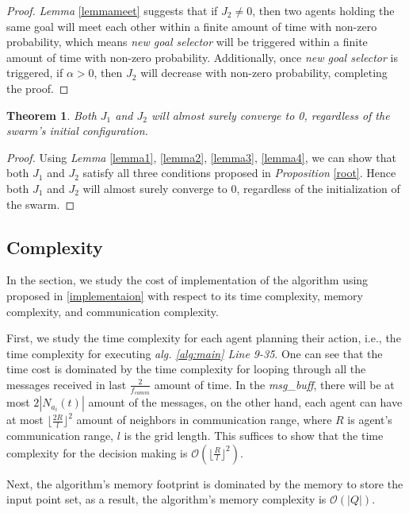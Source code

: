 \documentclass[journal]{IEEEtran}
\newtheorem{theorem}{Theorem}[subsection]
\begin{document}
\begin{proof}
\textit{Lemma} \ref{lemmameet} suggests that if $J_2\neq 0$, then two agents holding the same goal will meet each other within a finite amount of time with non-zero probability, which means \textit{new goal selector} will be triggered within a finite amount of time with non-zero probability. Additionally, once \textit{new goal selector} is triggered, if $\alpha > 0$, then $J_2$ will decrease with non-zero probability, completing the proof. 
\end{proof}


\begin{theorem} 
Both $J_1$ and $J_2$ will almost surely converge to 0, regardless of the swarm's initial configuration.
\end{theorem}

\begin{proof}
Using \textit{Lemma} \ref{lemma1}, \ref{lemma2}, \ref{lemma3}, \ref{lemma4}, we can show that both $J_1$ and $J_2$ satisfy all three conditions proposed in \textit{Proposition} \ref{root}. Hence both $J_1$ and $J_2$ will almost surely converge to 0, regardless of the initialization of the swarm.
\end{proof}

\subsection{Complexity}
In the section, we study the cost of implementation of the algorithm using proposed in \ref{implementaion} with respect to its time complexity, memory complexity, and communication complexity. 

First, we study the time complexity for each agent planning their action, i.e., the time complexity for executing \textit{alg. \ref{alg:main} \textit{Line 9-35}}. One can see that the time cost is dominated by the time complexity for looping through all the messages received in last $\frac{2}{f_{comm}}$ amount of time. In the \textit{msg\_buff}, there will be at most $2|N_{a_i}(t)|$ amount of the messages, on the other hand, each agent can have at most $\lfloor{\frac{2R}{l}}\rfloor^2$ amount of neighbors in communication range, where $R$ is agent's communication range, $l$ is the grid length. This suffices to show that the time complexity for the decision making is $\mathcal{O}(\lfloor{\frac{R}{l}}\rfloor^2)$. 

Next, the algorithm's memory footprint is dominated by the memory to store the input point set, as a result, the algorithm's memory complexity is $\mathcal{O}(|Q|)$.
\end{document}
